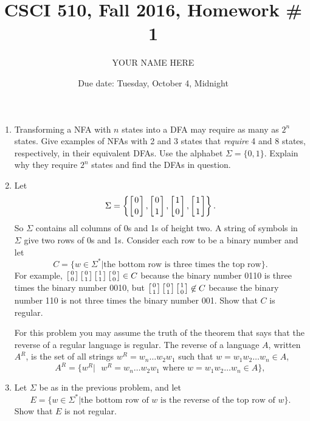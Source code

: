 \documentclass{article}
\title{CSCI 510, Fall 2016, Homework \# 1}
\author{YOUR NAME HERE}
\date{Due date: Tuesday, October 4, Midnight}
\newcommand{\duple}[2]{\left[{#1}\atop{#2}\right]}
\begin{document}
\maketitle
\begin{enumerate}
\item Transforming a NFA with $n$ states into a DFA may require as
  many as $2^n$ states.  Give examples of NFAs with 2 and 3 states
  that {\em require} 4 and 8 states, respectively, in their
  equivalent DFAs. Use the alphabet $\Sigma=\{0,1\}$.  Explain why
  they require $2^n$ states and find the DFAs in question.
\item
  Let
  \[
  \Sigma=\left\{\duple{0}{0},\duple{0}{1},\duple{1}{0},\duple{1}{1}\right\}.
  \]
  So $\Sigma$ contains all columns of 0s and 1s of height two.  A
  string of symbols in $\Sigma$ give two rows of 0s and 1s.  Consider
  each row to be a binary number and let
  \[
  C = \{w\in\Sigma^* | \mbox{the bottom row is three times the top
    row}\}.
  \]
  For example, $\duple 00\duple 01 \duple 11 \duple 00\in C$ because
  the binary number 0110 is three times the binary number 0010,
  but
  $\duple 01 \duple01\duple10\not\in C$ because the binary number 110
  is not three times the binary number 001.  Show that $C$ is
  regular.

  For this problem
  you may assume the truth of the theorem that says
  that the reverse of a regular language
  is regular.  The reverse of a language $A$, written $A^R$,
  is the set of all strings
  $w^R=w_n\ldots w_2w_1$ such that $w=w_1w_2\ldots w_n\in A$,
  \[
  A^R = \{w^R |  \mbox{ $w^R=w_n\ldots w_2w_1$ where  $w=w_1w_2\ldots
    w_n\in A$}\},
  \]

\item Let $\Sigma$ be as in the previous problem, and let
  \[
  E=\{w\in\Sigma^*|\mbox{the bottom row of $w$ is the reverse of the
    top row of $w$}\}.
    \]
    Show that $E$ is not regular.
\end{enumerate}
\end{document}
